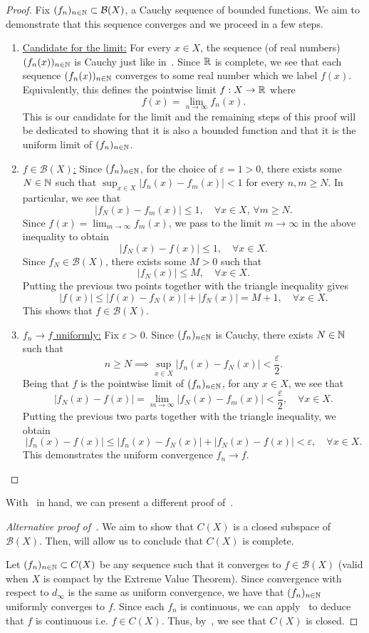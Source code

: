 \begin{proof}
Fix $(f_n)_{n\in\mathbb{N}}\subset \mathcal{B}(X)$, a Cauchy sequence of bounded functions. We aim to demonstrate that this sequence converges and we proceed in a few steps.
\begin{enumerate}
\item \ul{Candidate for the limit:} For every $x\in X$, the sequence (of real numbers) $(f_n(x))_{n\in\mathbb{N}}$ is Cauchy just like in~. Since $\mathbb{R}$ is complete, we see that each sequence $(f_n(x))_{n\in\mathbb{N}}$ converges to some real number which we label $f(x)$. Equivalently, this defines the pointwise limit $f:X\to\mathbb{R}$ where
\[
f(x) = \lim_{n\to\infty} f_n(x).
\]
This is our candidate for the limit and the remaining steps of this proof will be dedicated to showing that it is also a bounded function and that it is the uniform limit of $(f_n)_{n\in\mathbb{N}}$.
\item \ul{$f \in \mathcal{B}(X)$:} Since $(f_n)_{n\in\mathbb{N}}$, for the choice of $\varepsilon = 1>0$, there exists some $N\in\mathbb{N}$ such that $\sup_{x\in X}|f_n(x) - f_m(x)| < 1$ for every $n,m\ge N$. In particular, we see that
\[
|f_N(x) - f_m(x)|\le 1,\quad \forall x\in X,\, \forall m \ge N.
\]
Since $f(x) = \lim_{m\to \infty}f_m(x)$, we pass to the limit $m\to\infty$ in the above inequality to obtain
\[
|f_N(x) - f(x)|\le 1,\quad \forall x\in X.
\]
Since $f_N\in \mathcal{B}(X)$, there exists some $M>0$ such that
\[
|f_N(x)|\le M,\quad \forall x\in X.
\]
Putting the previous two points together with the triangle inequality gives
\[
|f(x)| \le |f(x) - f_N(x)| + |f_N(x)| = M+1,\quad \forall x\in X.
\]
This shows that $f\in \mathcal{B}(X)$.
\item \ul{$f_n\to f$ uniformly:} Fix $\varepsilon>0$. Since $(f_n)_{n\in\mathbb{N}}$ is Cauchy, there exists $N\in \mathbb{N}$ such that
\[
n\ge N \implies \sup_{x\in X}|f_n(x) - f_N(x)|<\frac{\varepsilon}{2}.
\]
Being that $f$ is the pointwise limit of $(f_n)_{n\in\mathbb{N}}$, for any $x\in X$, we see that
\[
|f_N(x) - f(x)| = \lim_{m\to\infty}|f_N(x) - f_m(x)| < \frac{\varepsilon}{2},\quad \forall x \in X.
\]
Putting the previous two parts together with the triangle inequality, we obtain
\[
|f_n(x) - f(x)| \le |f_n(x) - f_N(x)| + |f_N(x) - f(x)| < \varepsilon,\quad \forall x\in X.
\]
This demonstrates the uniform convergence $f_n \to f$.
\end{enumerate}
\end{proof}
With~ in hand, we can present a different proof of~.
\begin{proof}[Alternative proof of~]
We aim to show that $C(X)$ is a closed subspace of $\mathcal{B}(X)$. Then,  will allow us to conclude that $C(X)$ is complete. 

Let $(f_n)_{n\in\mathbb{N}} \subset C(X)$ be any sequence such that it converges to $f\in \mathcal{B}(X)$ (valid when $X$ is compact by the Extreme Value Theorem). Since convergence with respect to $d_\infty$ is the same as uniform convergence, we have that $(f_n)_{n\in\mathbb{N}}$ uniformly converges to $f$. Since each $f_n$ is continuous, we can apply~ to deduce that $f$ is continuous i.e. $f \in C(X)$. Thus, by~, we see that $C(X)$ is closed.
\end{proof}